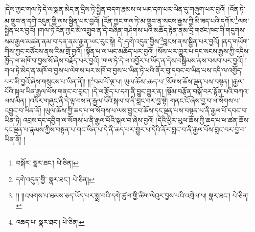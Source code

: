 །དེས་ཀྱང་གལ་ཏེ་དེ་ལ་སྨན་མེད་ན་དྲིས་ཏེ་སྦྱིན་བདག་རྣམས་ལ་ཡང་དག་པར་ལེན་དུ་གཞུག་པར་བྱའོ། །འོན་ཏེ་མ་གྲུབ་ན་དགེ་འདུན་གྱི་ལས་སྦྱིན་པར་བྱའོ། །འོན་ཀྱང་གལ་ཏེ་མ་གྲུབ་ན་སངས་རྒྱས་ཀྱི་མི་ཟད་པའི་དཀོར་\footnote{བསྐོར་  སྣར་ཐང་།  པེ་ཅིན། }ལས་སྦྱིན་པར་བྱའོ། །གལ་ཏེ་འོན་ཀྱང་མི་འགྲུབ་ན་དེ་བཞིན་གཤེགས་པའི་མཆོད་རྟེན་ནམ་དྲི་གཙང་ཁང་གི་གདུགས་སམ་རྒྱལ་མཚན་ནམ་བ་དན་ནམ་རྒྱན་ཡང་རུང་སྟེ། དེ་:དགེ་འདུན་གྱིས་\footnote{དགེ་འདུན་གྱི་  སྣར་ཐང་།  པེ་ཅིན། }བླངས་ནས་སྦྱིན་པར་བྱའོ། །ནད་གཡོག་གིས་ཀྱང་བཙོངས་ནས་རིམ་གྲོ་བྱའོ། །སྟོན་པ་ལ་ཡང་མཆོད་པར་བྱའོ། །སོས་པར་གྱུར་པ་དང་སངས་རྒྱས་ཀྱི་འདིས་ཁྱོད་ལ་མཁོ་བ་བྱས་སོ་ཞེས་བརྗོད་པར་བྱའོ། །གལ་ཏེ་དེ་ལ་འབྱོར་པ་ཡོད་ན་དེས་བསྒྲིམས་ནས་བསབ་པར་བྱའོ། །གལ་ཏེ་མེད་ན་མཁོ་བ་བྱས་པ་ལེགས་པར་མཁོ་བ་བྱས་པ་ཡིན་ཏེ་ཕའི་ནོར་བུ་དབང་བ་ཡིན་པས་འདི་ལ་འགྱོད་པར་མི་བྱའོ་ཞེས་གསུངས་པ་ཡིན་ནོ།། །།\footnote{།། །།འཕགས་པ་ཐམས་ཅད་ཡོད་པར་སྨྲ་བའི་དགེ་ཚུལ་གྱི་ཚིག་ལེའུར་བྱས་པའི་འགྲེལ་པ།   སྣར་ཐང་།  པེ་ཅིན། }བམ་པོ་ལྔ་པ། ཡུལ་ཆོས་:ཆད་པ་\footnote{འཆད་པ་  སྣར་ཐང་།  པེ་ཅིན། }སོགས་ཆོས་ལྡན་པས་བསྟན། །རྒྱལ་པོའི་སྐལ་ཡིན་རྒྱལ་པོས་གནང་བ་བླང་། །དེ་ལ་རྩོད་པ་དག་ནི་བྱུང་གྱུར་ན། །སྡོམ་བརྩོན་བསྐོ་བར་སྟོན་པའི་བཀའ་ལས་མིན། །འདིར་གཞུང་ནི་དེ་ལྟ་བས་ན་རྒྱལ་པོའི་སྐལ་བ་ནི་བླང་བར་བྱ་སྟེ། གནང་ངོ་ཞེས་བྱ་བ་ལ་སོགས་པ་འབྱུང་བ་ཡིན་ནོ། །ཡུལ་ཆོས་ཀྱི་ཆད་པ་ལ་སོགས་པ་ལས་བྱུང་བ་ཆོས་དང་ལྡན་པས་བསྟན་པ་ནི་རྒྱལ་པོ་དབང་བ་ཡིན་ཏེ། འབྲས་དང་དབྱིག་ལ་སོགས་པ་ནི་རྒྱལ་པོའི་སྐལ་བ་ཞེས་བྱའོ། །དེའི་ཕྱིར་ཡུལ་ཆོས་ཀྱི་ཆད་པ་ཕ་ཚན་ཆོས་དང་ལྡན་པ་རྣམས་ཀྱིས་བསྟན་པ་གང་ཡིན་པ་དེ་ནི་ཆད་པར་གྱུར་པ་དེའི་ནོར་བླང་བ་ནི་རྒྱལ་པོས་བླང་བར་བྱ་བ་ཡིན་ནོ། །
